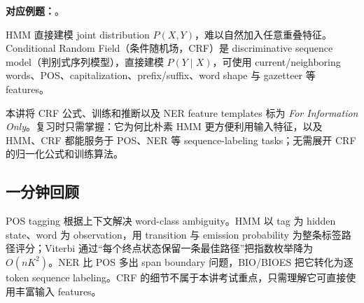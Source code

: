 \textbf{对应例题：}。


HMM 直接建模 joint distribution $P(X,Y)$，难以自然加入任意重叠特征。Conditional Random Field（条件随机场，CRF）是 discriminative sequence model（判别式序列模型），直接建模 $P(Y\mid X)$，可使用 current/neighboring words、POS、capitalization、prefix/suffix、word shape 与 gazetteer 等 features。

本讲将 CRF 公式、训练和推断以及 NER feature templates 标为 \textit{For Information Only}。复习时只需掌握：它为何比朴素 HMM 更方便利用输入特征，以及 HMM、CRF 都能服务于 POS、NER 等 sequence-labeling tasks；无需展开 CRF 的归一化公式和训练算法。

\subsection{一分钟回顾}

POS tagging 根据上下文解决 word-class ambiguity。HMM 以 tag 为 hidden state、word 为 observation，用 transition 与 emission probability 为整条标签路径评分；Viterbi 通过“每个终点状态保留一条最佳路径”把指数枚举降为 $O(nK^2)$。NER 比 POS 多出 span boundary 问题，BIO/BIOES 把它转化为逐 token sequence labeling。CRF 的细节不属于本讲考试重点，只需理解它可直接使用丰富输入 features。
